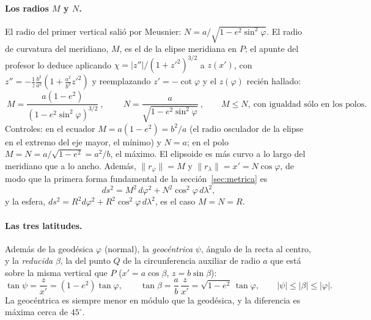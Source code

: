 \paragraph{Los radios \(M\) y \(N\).} El radio del primer vertical salió por Meusnier:
\(N=a/\sqrt{1-e^2\sin^2\varphi}\). El radio de curvatura del meridiano, \(M\), es el de
la elipse meridiana en \(P\); el apunte del profesor lo deduce aplicando
\(\chi=|z''|/(1+z'^2)^{3/2}\) a \(z(x')\), con \(z''=-\tfrac1z\tfrac{b^2}{a^2}(1+\tfrac{a^2}{b^2}z'^2)\)
y reemplazando \(z'=-\cot\varphi\) y el \(z(\varphi)\) recién hallado:
\[
  \boxed{\ M=\frac{a(1-e^2)}{(1-e^2\sin^2\varphi)^{3/2}}\ },\qquad
  \boxed{\ N=\frac{a}{\sqrt{1-e^2\sin^2\varphi}}\ },\qquad
  M\le N,\ \text{con igualdad sólo en los polos}.
\]
Controles: en el ecuador \(M=a(1-e^2)=b^2/a\) (el radio osculador de la elipse en el
extremo del eje mayor, el mínimo) y \(N=a\); en el polo \(M=N=a/\sqrt{1-e^2}=a^2/b\), el
máximo. El elipsoide es más curvo a lo largo del meridiano que a lo ancho. Además,
\(\|r_\varphi\|=M\) y \(\|r_\lambda\|=x'=N\cos\varphi\), de modo que la primera forma
fundamental de la sección~\ref{sec:metrica} es
\[
  ds^2=M^2\,d\varphi^2+N^2\cos^2\varphi\,d\lambda^2 ,
\]
y la esfera, \(ds^2=R^2d\varphi^2+R^2\cos^2\varphi\,d\lambda^2\), es el caso \(M=N=R\).

\paragraph{Las tres latitudes.} Además de la geodésica \(\varphi\) (normal), la
\emph{geocéntrica} \(\psi\), ángulo de la recta al centro, y la \emph{reducida} \(\beta\),
la del punto \(Q\) de la circunferencia auxiliar de radio \(a\) que está sobre la misma
vertical que \(P\) (\(x'=a\cos\beta\), \(z=b\sin\beta\)):
\[
  \tan\psi=\frac{z}{x'}=(1-e^2)\tan\varphi,\qquad
  \tan\beta=\frac ab\,\frac{z}{x'}=\sqrt{1-e^2}\,\tan\varphi,\qquad
  |\psi|\le|\beta|\le|\varphi| .
\]
La geocéntrica es siempre menor en módulo que la geodésica, y la diferencia es máxima
cerca de \(45^\circ\).

